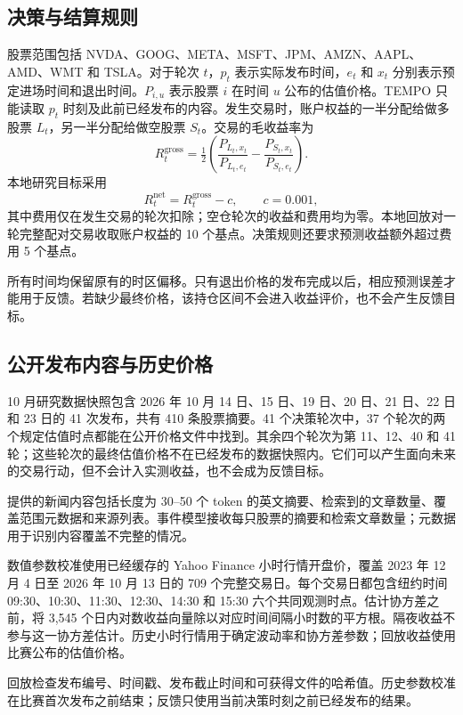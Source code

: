 \documentclass[conference]{IEEEtran}
\begin{document}
\subsection{决策与结算规则}
股票范围包括 NVDA、GOOG、META、MSFT、JPM、AMZN、AAPL、AMD、WMT 和 TSLA。对于轮次 $t$，$p_t$ 表示实际发布时间，$e_t$ 和 $x_t$ 分别表示预定进场时间和退出时间。$P_{i,u}$ 表示股票 $i$ 在时间 $u$ 公布的估值价格。TEMPO 只能读取 $p_t$ 时刻及此前已经发布的内容。发生交易时，账户权益的一半分配给做多股票 $L_t$，另一半分配给做空股票 $S_t$。交易的毛收益率为
\begin{equation}
 R_t^{\mathrm{gross}}=\tfrac12\left(
 \frac{P_{L_t,x_t}}{P_{L_t,e_t}}-
 \frac{P_{S_t,x_t}}{P_{S_t,e_t}}\right).
\end{equation}
本地研究目标采用
\begin{equation}
 R_t^{\mathrm{net}}=R_t^{\mathrm{gross}}-c,
 \qquad c=0.001,
\end{equation}
其中费用仅在发生交易的轮次扣除；空仓轮次的收益和费用均为零。本地回放对一轮完整配对交易收取账户权益的 10 个基点。决策规则还要求预测收益额外超过费用 5 个基点。

所有时间均保留原有的时区偏移。只有退出价格的发布完成以后，相应预测误差才能用于反馈。若缺少最终价格，该持仓区间不会进入收益评价，也不会产生反馈目标。

\subsection{公开发布内容与历史价格}
10 月研究数据快照包含 2026 年 10 月 14 日、15 日、19 日、20 日、21 日、22 日和 23 日的 41 次发布，共有 410 条股票摘要。41 个决策轮次中，37 个轮次的两个规定估值时点都能在公开价格文件中找到。其余四个轮次为第 11、12、40 和 41 轮；这些轮次的最终估值价格不在已经发布的数据快照内。它们可以产生面向未来的交易行动，但不会计入实测收益，也不会成为反馈目标。

提供的新闻内容包括长度为 30--50 个 token 的英文摘要、检索到的文章数量、覆盖范围元数据和来源列表。事件模型接收每只股票的摘要和检索文章数量；元数据用于识别内容覆盖不完整的情况。

数值参数校准使用已经缓存的 Yahoo Finance 小时行情开盘价，覆盖 2023 年 12 月 4 日至 2026 年 10 月 13 日的 709 个完整交易日。每个交易日都包含纽约时间 09:30、10:30、11:30、12:30、14:30 和 15:30 六个共同观测时点。估计协方差之前，将 3,545 个日内对数收益向量除以对应时间间隔小时数的平方根。隔夜收益不参与这一协方差估计。历史小时行情用于确定波动率和协方差参数；回放收益使用比赛公布的估值价格。

回放检查发布编号、时间戳、发布截止时间和可获得文件的哈希值。历史参数校准在比赛首次发布之前结束；反馈只使用当前决策时刻之前已经发布的结果。
\end{document}

